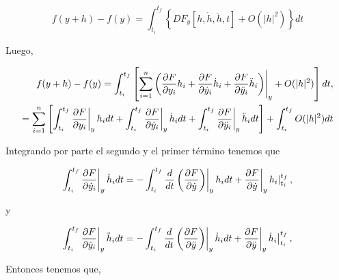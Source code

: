 \documentclass[a4paper,10pt]{article}
\numberwithin{equation}{section}
\newcommand{\zerodel}{.\kern-\nulldelimiterspace}
\begin{document}
\begin{equation}
 f(y+h) - f(y) =  \int_{t_{i}}^{t_{f}} \left\{DF_y[h,\dot{h},\ddot{h},t] + O(|h|^2) \right\}dt
\end{equation}

Luego,

\begin{align*}
 f(y+h) - f(y) = \int_{t_{i}}^{t_{f}} \left[ \left\zerodel \sum_{i=1}^n  \left( \frac{\partial F}{\partial y_i}h_i + 
 \frac{\partial F}{\partial \dot{y}_i}\dot{h}_i + \frac{\partial F}{\partial \ddot{y}_i}\ddot{h}_i\right)\right|_{y} 
 + O(|h|^2) \right]dt, \\
%  
	      = \sum_{i=1}^n \left[\int_{t_{i}}^{t_{f}}\left\zerodel\frac{\partial F}{\partial y_i}\right|_y h_i dt  
	      + \int_{t_{i}}^{t_{f}} \left\zerodel\frac{\partial F}{\partial \dot{y}_i}\right|_y \dot{h}_i dt
	       + \int_{t_{i}}^{t_{f}} \left\zerodel\frac{\partial F}{\partial \ddot{y}_i}\right|_y \ddot{h}_i dt\right] 
	       +  \int_{t_{i}}^{t_{f}} O(|h|^2)dt
\end{align*}

Integrando por parte el segundo y el primer término tenemos que

\begin{equation}
  \int_{t_{i}}^{t_{f}} \left\zerodel\frac{\partial F}{\partial \dot{y}_i}\right|_y \dot{h}_i dt = 
  - \int_{t_{i}}^{t_{f}} \frac{d}{dt}\left(\left\zerodel\frac{\partial F}{\partial \dot{y}}\right)\right|_y h_i dt + 
  \left\zerodel\frac{\partial F}{\partial \dot{y}}\right|_y \left\zerodel h_i\right|_{t_{i}}^{t_{f}},
\end{equation}

y

\begin{equation}
  \int_{t_{i}}^{t_{f}} \left\zerodel\frac{\partial F}{\partial \ddot{y}_i}\right|_y \ddot{h}_i dt = 
  - \int_{t_{i}}^{t_{f}} \frac{d}{dt}\left(\left\zerodel\frac{\partial F}{\partial \ddot{y}}\right)\right|_y \dot{h}_i dt + 
  \left\zerodel\frac{\partial F}{\partial \ddot{y}}\right|_y \left\zerodel \dot{h}_i\right|_{t_{i}}^{t_{f}},
\end{equation}

Entonces tenemos que,
\end{document}
